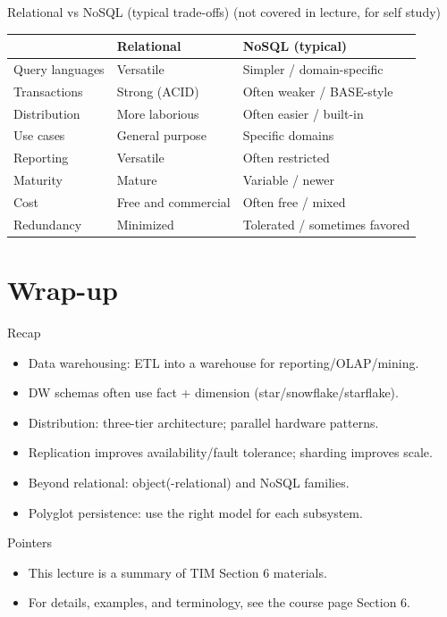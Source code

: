 \documentclass[10pt,aspectratio=169]{beamer}
\begin{document}
\begin{frame}{Relational vs NoSQL (typical trade-offs) (not covered in lecture, for self study)}
\scriptsize
\begin{tabular}{@{}p{3.6cm}p{5.6cm}p{5.2cm}@{}}
\toprule
 & \textbf{Relational} & \textbf{NoSQL (typical)} \\
\midrule
Query languages & Versatile & Simpler / domain-specific \\
Transactions & Strong (ACID) & Often weaker / BASE-style \\
Distribution & More laborious & Often easier / built-in \\
Use cases & General purpose & Specific domains \\
Reporting & Versatile & Often restricted \\
Maturity & Mature & Variable / newer \\
Cost & Free and commercial & Often free / mixed \\
Redundancy & Minimized & Tolerated / sometimes favored \\
\bottomrule
\end{tabular}
\end{frame}

\section{Wrap-up}

\begin{frame}{Recap}
\begin{itemize}
  \item Data warehousing: ETL into a warehouse for reporting/OLAP/mining.
  \item DW schemas often use fact + dimension (star/snowflake/starflake).
  \item Distribution: three-tier architecture; parallel hardware patterns.
  \item Replication improves availability/fault tolerance; sharding improves scale.
  \item Beyond relational: object(-relational) and NoSQL families.
  \item Polyglot persistence: use the right model for each subsystem.
\end{itemize}
\end{frame}

\begin{frame}{Pointers}
\begin{itemize}
  \item This lecture is a summary of TIM Section 6 materials.
  \item For details, examples, and terminology, see the course page Section 6.
\end{itemize}
\end{frame}
\end{document}
